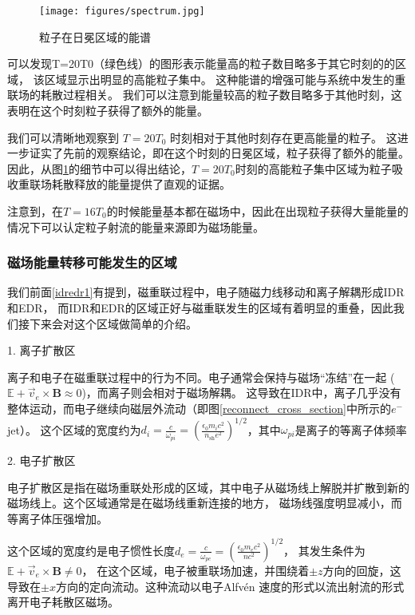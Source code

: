 \begin{figure}[H]
    \centering
    \texttt{[image: figures/spectrum.jpg]}
    \caption{粒子在日冕区域的能谱}
    \label{corona}
\end{figure}

可以发现T=20T0（绿色线）的图形表示能量高的粒子数目略多于其它时刻的的区域，
该区域显示出明显的高能粒子集中。
这种能谱的增强可能与系统中发生的重联场的耗散过程相关。
我们可以注意到能量较高的粒子数目略多于其他时刻，这表明在这个时刻粒子获得了额外的能量。

我们可以清晰地观察到 $T=20T_0$ 时刻相对于其他时刻存在更高能量的粒子。
这进一步证实了先前的观察结论，即在这个时刻的日冕区域，粒子获得了额外的能量。
因此，从图\ref{corona}的细节中可以得出结论，$T=20T_0$时刻的高能粒子集中区域为粒子吸收重联场耗散释放的能量提供了直观的证据。

注意到，在$T=16T_0$的时候能量基本都在磁场中，因此在出现粒子获得大量能量的情况下可以认定粒子射流的能量来源即为磁场能量。

\subsubsection*{\textbf{磁场能量转移可能发生的区域}}
我们前面\ref{idredr1}有提到，磁重联过程中，电子随磁力线移动和离子解耦形成IDR和EDR，
而IDR和EDR的区域正好与磁重联发生的区域有着明显的重叠，因此我们接下来会对这个区域做简单的介绍。

1. 离子扩散区\cite{2016ASSL..427.....G}

离子和电子在磁重联过程中的行为不同。电子通常会保持与磁场“冻结”在一起
($\displaystyle\mathbb{E} + \vec{v}_e \times \mathbf{B}\approx 0$)，而离子则会相对于磁场解耦。
这导致在IDR中，离子几乎没有整体运动，而电子继续向磁层外流动\cite{https://doi.org/10.1029/1998GL900036}（即图\ref{reconnect_cross_section}中所示的$e^-$ jet）。
这个区域的宽度约为$\displaystyle d_i = \frac{c}{\omega_{pi}} = \left(\frac{\epsilon_0m_ic^2}{n_\mathrm{sh}e^2}\right)^{1/2}$，其中$\omega_{pi}$是离子的等离子体频率

2. 电子扩散区\cite{2016ASSL..427.....G}

电子扩散区是指在磁场重联处形成的区域，其中电子从磁场线上解脱并扩散到新的磁场线上。这个区域通常是在磁场线重新连接的地方，
磁场线强度明显减小，而等离子体压强增加。

这个区域的宽度约是电子惯性长度$\displaystyle d_e = \frac{c}{\omega_{pe}} = (\frac{\epsilon_0 m_e c^2}{nc^2})^{1/2}$，
其发生条件\cite{PhysRevLett.89.015002}为$\displaystyle\mathbb{E} + \vec{v}_e \times \mathbf{B}\neq 0$，
在这个区域，电子被重联场加速，并围绕着$\pm z$方向的回旋，这导致在$\pm x$方向的定向流动。这种流动以电子Alfvén\cite{PhysRevLett.89.015002} 
速度的形式以流出射流的形式离开电子耗散区磁场。

